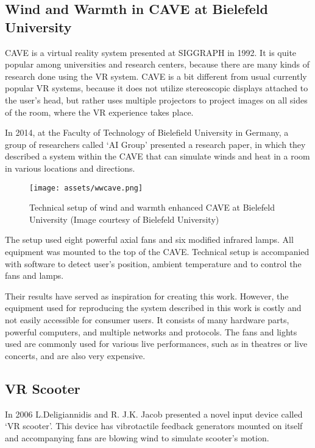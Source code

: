 \hypertarget{x-wind-and-warmth-in-cave-at-bielefeld-university}{\subsection{Wind and Warmth in CAVE at Bielefeld University}}
CAVE is a virtual reality system presented at SIGGRAPH in 1992.
It is quite popular among universities and research centers, because there are
many kinds of research done using the VR system. CAVE is a bit different from
usual currently popular VR systems, because it does not utilize
stereoscopic displays attached to the user’s head, but rather uses multiple
projectors to project images on all sides of the room, where the
VR experience takes place.


In 2014, at the Faculty of Technology of Bielefield University in Germany,
a group of researchers called `AI Group' presented a research paper, in which
they described a system within the CAVE that can simulate winds
and heat in a room in various locations and directions.\,\cite{wwcave}

\begin{figure}[h]{}
    \centering\texttt{[image: assets/wwcave.png]}
    \caption{Technical setup of wind and warmth enhanced CAVE at 
    Bielefeld University (Image courtesy of Bielefeld University)}
\end{figure}

The setup used eight powerful axial fans and six modified
infrared lamps. All equipment was mounted to the top of the CAVE. Technical
setup is accompanied with software to detect user's position, ambient
temperature and to control the fans and lamps.

Their results have served as inspiration for creating this work.
However, the equipment used for reproducing the system described in this work
is costly and not easily accessible for consumer users.
It consists of many hardware parts, powerful computers, and multiple
networks and protocols. The fans and lights used are commonly used
for various live performances, such as in theatres or live concerts, and are
also very expensive.


\hypertarget{x-vr-scooter}{\subsection{VR Scooter}}
In 2006 L.Deligiannidis and R. J.K. Jacob presented a novel input device called
`VR scooter'. This device has vibrotactile feedback generators mounted on itself
and accompanying fans are blowing wind to simulate scooter’s motion.\,\cite{vrscooter}

